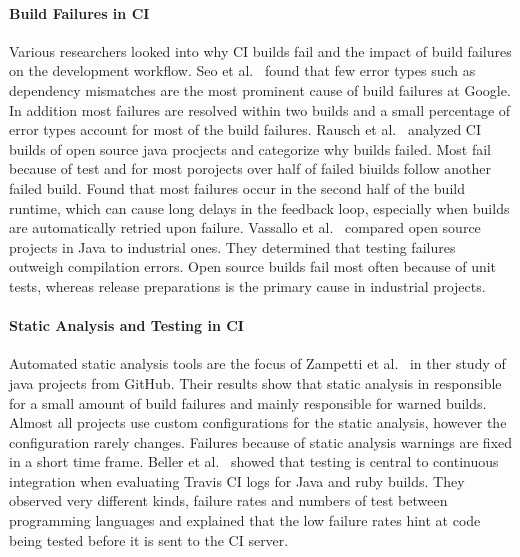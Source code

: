 \documentclass[\myrootdir/main.tex]{subfiles}
\begin{document}
\paragraph{Build Failures in CI}
Various researchers looked into why CI builds fail and the impact of build failures on the development workflow.
Seo et al.~\cite{seo2014programmers} found that few error types such as dependency mismatches are the most prominent cause of build failures at Google.
In addition most failures are resolved within two builds and a small percentage of error types account for most of the build failures.
Rausch et al.~\cite{rausch2017empirical} analyzed CI builds of open source java procjects and categorize why builds failed.
Most fail because of test  and for most porojects over half of failed biuilds follow another failed build.
Found that most failures occur in the second half of the build runtime, which can cause long delays in the feedback loop, especially when builds are automatically retried upon failure.
Vassallo et al.~\cite{vassallo2017a-tale} compared open source projects in Java to industrial ones.
They determined that testing failures outweigh compilation errors.
Open source builds fail most often because of unit tests, whereas release preparations is the primary cause in industrial projects.

\paragraph{Static Analysis and Testing in CI}
Automated static analysis tools are the focus of Zampetti et al.~\cite{zampetti2017open} in ther study of java projects from GitHub.
Their results show that static analysis in responsible for a small amount of build failures and mainly responsible for warned builds.
Almost all projects use custom configurations for the static analysis, however the configuration rarely changes.
Failures because of static analysis warnings are fixed in a short time frame.
Beller et al.~\cite{beller2017oops} showed that testing is central to continuous integration when evaluating Travis CI logs for Java and ruby builds.
They observed very different kinds, failure rates and numbers of test between programming languages and explained that the low failure rates hint at code being tested before it is sent to the CI server.
\end{document}
